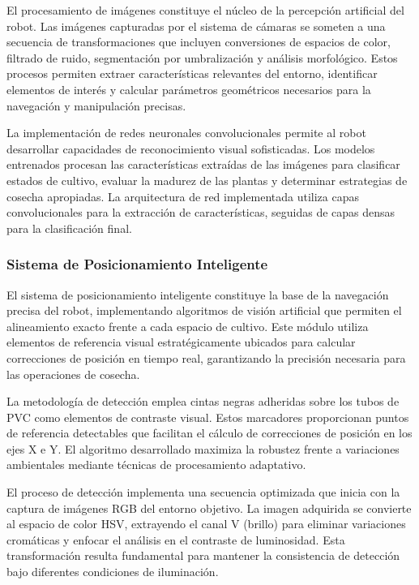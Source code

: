El procesamiento de imágenes constituye el núcleo de la percepción artificial del robot. Las imágenes capturadas por el sistema de cámaras se someten a una secuencia de transformaciones que incluyen conversiones de espacios de color, filtrado de ruido, segmentación por umbralización y análisis morfológico. Estos procesos permiten extraer características relevantes del entorno, identificar elementos de interés y calcular parámetros geométricos necesarios para la navegación y manipulación precisas.

La implementación de redes neuronales convolucionales permite al robot desarrollar capacidades de reconocimiento visual sofisticadas. Los modelos entrenados procesan las características extraídas de las imágenes para clasificar estados de cultivo, evaluar la madurez de las plantas y determinar estrategias de cosecha apropiadas. La arquitectura de red implementada utiliza capas convolucionales para la extracción de características, seguidas de capas densas para la clasificación final.

\subsubsection{Sistema de Posicionamiento Inteligente}

El sistema de posicionamiento inteligente constituye la base de la navegación precisa del robot, implementando algoritmos de visión artificial que permiten el alineamiento exacto frente a cada espacio de cultivo. Este módulo utiliza elementos de referencia visual estratégicamente ubicados para calcular correcciones de posición en tiempo real, garantizando la precisión necesaria para las operaciones de cosecha.

La metodología de detección emplea cintas negras adheridas sobre los tubos de PVC como elementos de contraste visual. Estos marcadores proporcionan puntos de referencia detectables que facilitan el cálculo de correcciones de posición en los ejes X e Y. El algoritmo desarrollado maximiza la robustez frente a variaciones ambientales mediante técnicas de procesamiento adaptativo.

El proceso de detección implementa una secuencia optimizada que inicia con la captura de imágenes RGB del entorno objetivo. La imagen adquirida se convierte al espacio de color HSV, extrayendo el canal V (brillo) para eliminar variaciones cromáticas y enfocar el análisis en el contraste de luminosidad. Esta transformación resulta fundamental para mantener la consistencia de detección bajo diferentes condiciones de iluminación.

